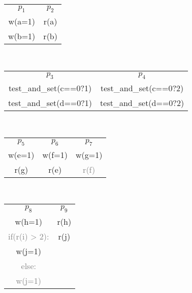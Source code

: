 \begin{figure*}
\begin{subfigure}[t]{.2\linewidth}
\begin{center}
\begin{tabular}{ c c }
 $p_1$ & $p_2$ \\
 w(a=1) & r(a) \\  
 w(b=1) & r(b)    
\end{tabular}
\caption{}
\label{subfig:wa_wb}
\end{center}
\end{subfigure}
~
\begin{subfigure}[t]{.4\linewidth}
\begin{center}
\begin{tabular}{ c c }
 $p_3$ & $p_4$ \\
 test\_and\_set(c==0?1) & test\_and\_set(c==0?2) \\  
 test\_and\_set(d==0?1) & test\_and\_set(d==0?2)   
\end{tabular}
\caption{}
\label{subfig:test_and_set}
\end{center}
\end{subfigure}
~
\begin{subfigure}[t]{.3\linewidth}
\begin{center}
\begin{tabular}{ c c c }
 $p_5$ & $p_6$ & $p_7$ \\
 w(e=1) & w(f=1) & w(g=1) \\  
 r(g) & r(e)    & \textcolor{gray}{r(f)}
\end{tabular}
\caption{}
\label{subfig:read_breaks}
\end{center}
\end{subfigure}
~
\begin{subfigure}[t]{.2\linewidth}
\begin{center}
\begin{tabular}{ c c }
 $p_8$ & $p_9$ \\
 w(h=1) & r(h) \\  
 \textcolor{gray}{if(r(i) > 2):} & r(j) \\
 w(j=1) & \\
 \textcolor{gray}{else:} & \\
 \textcolor{gray}{w(j=1)}
\end{tabular}
\caption{}
\label{subfig:optimize_breaks}
\end{center}
\end{subfigure}
~
\begin{subfigure}[t]{.2\linewidth}
\begin{center}

\end{center}
\end{subfigure}
\end{figure*}
